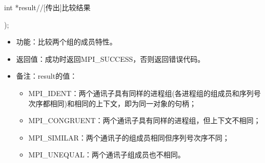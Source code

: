 \documentclass[UTF8]{article}%
\begin{document}
    \qquad int        *result//[传出]比较结果

);

\begin{itemize}
    \item 功能：比较两个组的成员特性。
    \item 返回值：成功时返回MPI\_SUCCESS，否则返回错误代码。
    \item 备注：result的值：
    
    {
        \begin{itemize}
            \item MPI\_IDENT：两个通讯子具有同样的进程组(各进程组的组成员和序列号次序都相同)和相同的上下文，即为同一对象的句柄；
            \item MPI\_CONGRUENT：两个通讯子具有同样的进程组，但上下文不相同；
            \item MPI\_SIMILAR：两个通讯子的组成员相同但序列号次序不同；
            \item MPI\_UNEQUAL：两个通讯子组成员也不相同。
        \end{itemize}
    }

\end{itemize}
\end{document}
